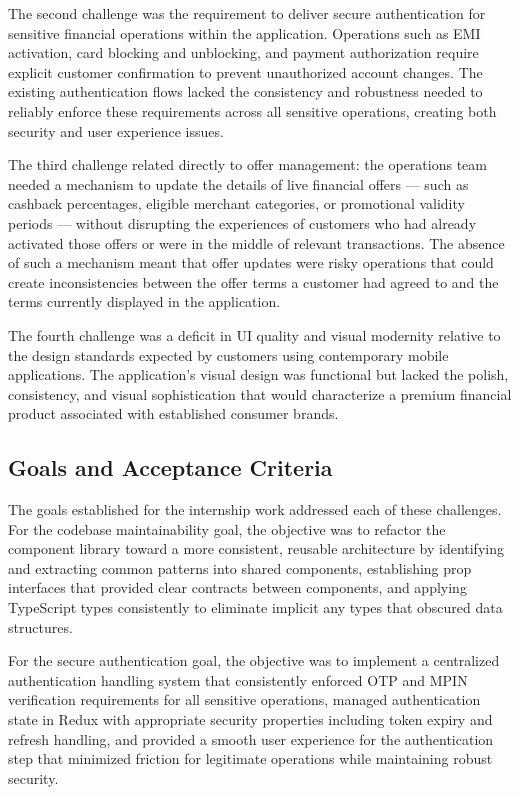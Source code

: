 The second challenge was the requirement to deliver secure authentication for sensitive financial operations within the application. Operations such as EMI activation, card blocking and unblocking, and payment authorization require explicit customer confirmation to prevent unauthorized account changes. The existing authentication flows lacked the consistency and robustness needed to reliably enforce these requirements across all sensitive operations, creating both security and user experience issues.

The third challenge related directly to offer management: the operations team needed a mechanism to update the details of live financial offers — such as cashback percentages, eligible merchant categories, or promotional validity periods — without disrupting the experiences of customers who had already activated those offers or were in the middle of relevant transactions. The absence of such a mechanism meant that offer updates were risky operations that could create inconsistencies between the offer terms a customer had agreed to and the terms currently displayed in the application.

The fourth challenge was a deficit in UI quality and visual modernity relative to the design standards expected by customers using contemporary mobile applications. The application's visual design was functional but lacked the polish, consistency, and visual sophistication that would characterize a premium financial product associated with established consumer brands.

\subsection{Goals and Acceptance Criteria}

The goals established for the internship work addressed each of these challenges. For the codebase maintainability goal, the objective was to refactor the component library toward a more consistent, reusable architecture by identifying and extracting common patterns into shared components, establishing prop interfaces that provided clear contracts between components, and applying TypeScript types consistently to eliminate implicit any types that obscured data structures.

For the secure authentication goal, the objective was to implement a centralized authentication handling system that consistently enforced OTP and MPIN verification requirements for all sensitive operations, managed authentication state in Redux with appropriate security properties including token expiry and refresh handling, and provided a smooth user experience for the authentication step that minimized friction for legitimate operations while maintaining robust security.

